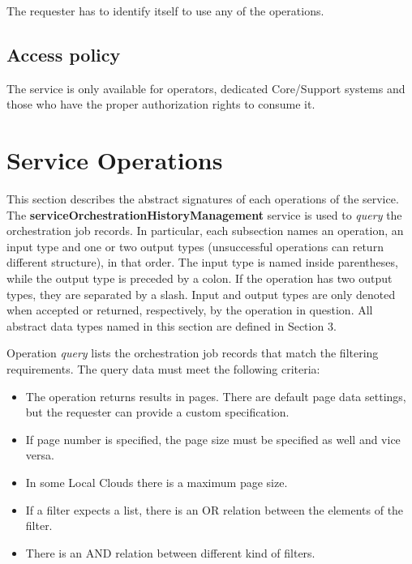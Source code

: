 \documentclass[a4paper]{arrowhead}
\begin{document}
The requester has to identify itself to use any of the operations. 

\subsection{Access policy}
\label{sec:accesspolicy}

The service is only available for operators, dedicated Core/Support systems and those who have the proper authorization rights to consume it.

\newpage

\section{Service Operations}
\label{sec:functions}

This section describes the abstract signatures of each operations of the service. The \textbf{serviceOrchestrationHistoryManagement} service is used to \textit{query} the orchestration job records.
In particular, each subsection names an operation, an input type and one or two output types (unsuccessful operations can return different structure), in that order.
The input type is named inside parentheses, while the output type is preceded by a colon. If the operation has two output types, they are separated by a slash.
Input and output types are only denoted when accepted or returned, respectively, by the operation in question. All abstract data types named in this section are defined in Section 3.



Operation \textit{query} lists the orchestration job records that match the filtering requirements. The query data must meet the following criteria:

\begin{itemize}
    \item The operation returns results in pages. There are default page data settings, but the requester can provide a custom specification.
    \item If page number is specified, the page size must be specified as well and vice versa.
    \item In some Local Clouds there is a maximum page size.
    \item If a filter expects a list, there is an OR relation between the elements of the filter.
    \item There is an AND relation between different kind of filters.
\end{itemize}
\end{document}
